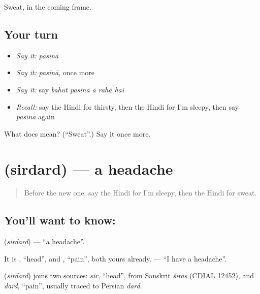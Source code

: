 \begin{grammarlens}[title={What you've built}]
Sweat, in the coming frame.
\end{grammarlens}

\subsection*{Your turn}
\begin{itemize}
\raggedright
  \item \emph{Say it:} \emph{pasīnā}
  \item \emph{Say it:} \emph{pasīnā}, once more
  \item \emph{Say it:} say \emph{bahut pasīnā ā rahā hai}
  \item \emph{Recall:} say the Hindi for thirsty, then the Hindi for I'm sleepy, then say \emph{pasīnā} again
\end{itemize}

\begin{tcolorbox}[breakable,colback=teal!4,colframe=teal!35!black,title={Before you move on}]
What does  mean? (\textquotedblleft{}Sweat\textquotedblright{}.) Say it once more.
\end{tcolorbox}
\section[\texorpdfstring{\hi{सिरदर्द} (sirdard)}{सिरदर्द (sirdard)}]{ (sirdard) — a headache}

\label{lesson:HI-C124-sirdard}



\begin{quote}
Before the new one: say the Hindi for I'm sleepy, then the Hindi for sweat.
\end{quote}

\subsection*{You'll want to know: }
\textbf{} (\emph{sirdard}) — \textquotedblleft{}a headache\textquotedblright{}.

It is \textbf{}, \textquotedblleft{}head\textquotedblright{}, and \textbf{}, \textquotedblleft{}pain\textquotedblright{}, both yours already. \textbf{  } — \textquotedblleft{}I have a headache\textquotedblright{}.

\begin{cousinweb}
\textbf{} (\emph{sirdard}) joins two sources: \emph{sir}, \textquotedblleft{}head\textquotedblright{}, from Sanskrit \emph{śiras} (CDIAL 12452), and \emph{dard}, \textquotedblleft{}pain\textquotedblright{}, usually traced to Persian \emph{dard}.
\end{cousinweb}

